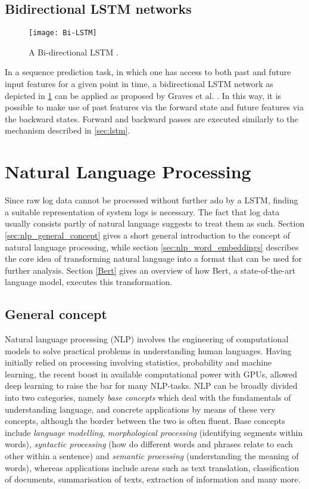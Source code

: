 \subsection{Bidirectional LSTM networks \label{sec:bi-lstm}}
\begin{figure}[h]
  \centering
  \texttt{[image: Bi-LSTM]} \\
  \caption{A Bi-directional LSTM \cite{graves2013speech}.}
  \label{fig:bi-lstm}
\end{figure}
In a sequence prediction task, in which one has access to both past and future input features for a given point in time, a bidirectional LSTM network as depicted in \ref{fig:bi-lstm} can be applied as proposed by Graves et al. \cite{graves2013speech}. In this way, it is possible to make use of past features via the forward state and future features via the backward states. Forward and backward passes are executed similarly to the mechanism described in \ref{sec:lstm}.




\section{Natural Language Processing \label{sec:natural-language-processing}}
Since raw log data cannot be processed without further ado by a LSTM, finding a suitable representation of system logs is necessary. The fact that log data usually consists partly of natural language suggests to treat them as such. Section \ref{sec:nlp_general_concept} gives a short general introduction to the concept of natural language processing, while section \ref{sec:nlp_word_embeddings} describes the core idea of transforming natural language into a format that can be used for further analysis. Section \ref{Bert} gives an overview of how Bert, a state-of-the-art language model, executes this transformation.

\subsection{General concept \label{sec:nlp_general_concept}}
Natural language processing (NLP) involves the engineering of computational models to solve practical problems in understanding human languages. Having initially relied on processing involving statistics, probability and machine learning, the recent boost in available computational power with GPUs, allowed deep learning to raise the bar for many NLP-tasks. NLP can be broadly divided into two categories, namely \textit{base concepts} which deal with the fundamentals of understanding language, and concrete applications by means of these very concepts, although the border between the two is often fluent. Base concepts include \textit{language modelling}, \textit{morphological processing} (identifying segments within words), \textit{syntactic processing} (how do different words and phrases relate to each other within a sentence) and \textit{semantic processing} (understanding the meaning of words), whereas applications include areas such as text translation, classification of documents, summarisation of texts, extraction of information and many more.
